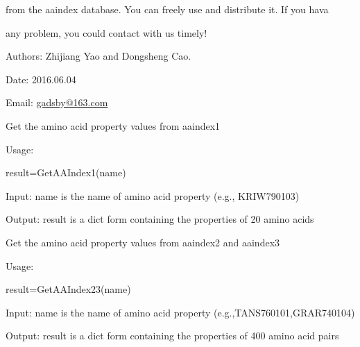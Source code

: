 \documentclass[letterpaper,10pt,english]{sphinxmanual}
\begin{document}
from the aaindex database. You can freely use and distribute it. If you hava

any problem, you could contact with us timely!

Authors: Zhijiang Yao and Dongsheng Cao.

Date: 2016.06.04

Email: \href{mailto:gadsby@163.com}{gadsby@163.com}

\begin{fulllineitems}
\label{reference/AAIndex:AAIndex.GetAAIndex1}
Get the amino acid property values from aaindex1

Usage:

result=GetAAIndex1(name)

Input: name is the name of amino acid property (e.g., KRIW790103)

Output: result is a dict form containing the properties of 20 amino acids

\end{fulllineitems}


\begin{fulllineitems}
\label{reference/AAIndex:AAIndex.GetAAIndex23}
Get the amino acid property values from aaindex2 and aaindex3

Usage:

result=GetAAIndex23(name)

Input: name is the name of amino acid property (e.g.,TANS760101,GRAR740104)

Output: result is a dict form containing the properties of 400 amino acid pairs

\end{fulllineitems}

\end{document}

